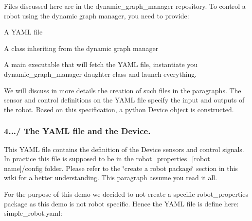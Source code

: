 Files discussed here are in the dynamic\+\_\+graph\+\_\+manager repository. To control a robot using the dynamic graph manager, you need to provide\+:
\begin{DoxyItemize}
\item A Y\+A\+ML file
\item A class inheriting from the dynamic graph manager
\item A main executable that will fetch the Y\+A\+ML file, instantiate you dynamic\+\_\+graph\+\_\+manager daughter class and launch everything.
\end{DoxyItemize}

We will discuss in more details the creation of such files in the paragraphs. The sensor and control definitions on the Y\+A\+ML file specify the input and outputs of the robot. Based on this specification, a python Device object is constructed.\hypertarget{subsubpage_implement_dgm_dgm_impl_sec_yaml_file}{}\subsubsection{4.../ The Y\+A\+M\+L file and the Device.}\label{subsubpage_implement_dgm_dgm_impl_sec_yaml_file}
This Y\+A\+ML file contains the definition of the Device sensors and control signals. In practice this file is supposed to be in the robot\+\_\+properties\+\_\+\mbox{[}robot name\mbox{]}/config folder. Please refer to the \char`\"{}create a robot
package\char`\"{} section in this wiki for a better understanding. This paragraph assume you read it all.

For the purpose of this demo we decided to not create a specific robot\+\_\+properties package as this demo is not robot specific. Hence the Y\+A\+ML file is define here\+: simple\+\_\+robot.\+yaml\+: 

